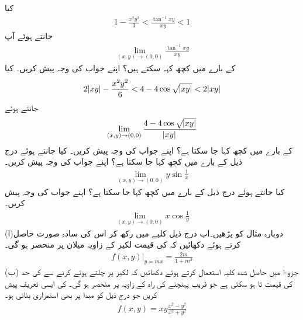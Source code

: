 کیا 
\begin{align*}
1-\frac{x^2y^2}{3}<\frac{\tan^{-1}xy}{xy}<1
\end{align*}
جانتے ہوئے آپ
\begin{align*}
\lim\limits_{(x,y)\to(0,0)}\frac{\tan^{-1}xy}{xy}
\end{align*}
کے بارے میں کچھ کہہ سکتے ہیں؟ اپنے جواب کی وجہ پیش کریں۔
کیا
\begin{align*}
2\abs{xy}-\frac{x^2y^2}{6}<4-4\cos\sqrt{\abs{xy}}<2\abs{xy}
\end{align*}
جانتے ہوئے
\begin{align*}
\lim\limits_{(x,y)\to(0,0)}\frac{4-4\cos\sqrt{\abs{xy}}}{\abs{xy}}
\end{align*}
کے بارے میں کچھ کہا جا سکتا ہے؟ اپنے جواب کی وجہ پیش کریں۔
کیا  جانتے ہوئے درج ذیل کے بارے میں کچھ کہا جا سکتا ہے؟ اپنے جواب کی وجہ پیش کریں۔
\begin{align*}
\lim\limits_{(x,y)\to(0,0)}y\sin\frac{1}{x}
\end{align*}
کیا  جانتے ہوئے درج ذیل کے بارے میں کچھ کہا جا سکتا ہے؟ اپنے جواب کی وجہ پیش کریں۔
\begin{align*}
\lim\limits_{(x,y)\to(0,0)}x\cos\frac{1}{y}
\end{align*}
(ا)دوبارہ  مثال  کو  پڑھیں۔اب درج ذیل کلیے  میں  رکھ کر  اس کی سادہ صورت حاصل کرتے ہوئے دکھائیں کہ  کی قیمت  لکیر کے زاویہ میلان  پر منحصر ہو  گی۔
\begin{align*}
\left.f(x,y)\right\vert_{y=mx}=\frac{2m}{1+m^2}
\end{align*}
(ب) جزو-ا میں حاصل شدہ  کلیہ استعمال کرتے ہوئے دکھائیں کہ لکیر  پر چلتے ہوئے  کرنے سے  کی   حد کی قیمت  تا  ہو سکتی ہے جو قریب پہنچنے کی راہ کے  زاویہ پر منحصر ہو گی۔  
 کی ایسی تعریف پیش کریں جو درج ذیل کو مبدا پر بھی استمراری بناتی  ہو۔
\begin{align*}
f(x,y)=xy\frac{x^2-y^2}{x^2+y^2}
\end{align*}

